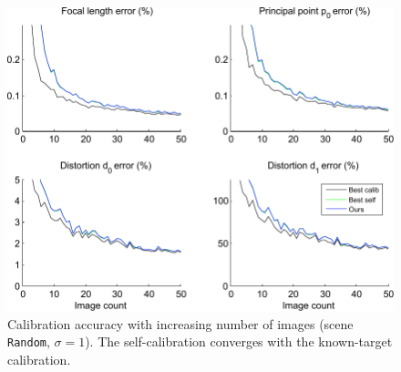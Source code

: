 \documentclass[10pt,twocolumn,letterpaper]{article}
\begin{document}
\begin{figure}
\centering
\includegraphics[width=\linewidth]{images/resultsFrameCount.pdf}
\caption{Calibration accuracy with increasing number of images (scene \texttt{Random}, $\sigma=1$). The self-calibration converges with the known-target calibration.}
\label{fig:results_frames}
\end{figure}

\end{document}
